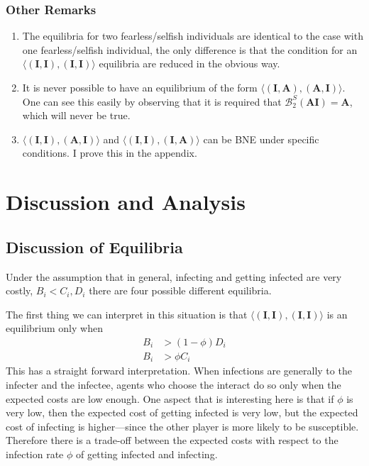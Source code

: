 \documentclass{article}
\theoremstyle{definition}
\theoremstyle{exercise}
\theoremstyle{remark}
\begin{document}
\subsubsection*{Other Remarks}
\begin{enumerate}[1.]
    \item The equilibria for two fearless/selfish individuals are identical to the case with one fearless/selfish individual, the only difference is that the condition for an $\langle (\bm{I}, \bm{I}), (\bm{I}, \bm{I}) \rangle$ equilibria are reduced in the obvious way.
    \item It is never possible to have an equilibrium of the form $ \langle (\bm{I}, \bm{A}), (\bm{A}, \bm{I}) \rangle$. One can see this easily by observing that it is required that $\mathcal{B}^{S}_2(\bm{AI}) = \bm{A}$, which will never be true.
\item $ \langle (\bm{I}, \bm{I}), (\bm{A}, \bm{I}) \rangle$ and $ \langle (\bm{I}, \bm{I}), (\bm{I}, \bm{A}) \rangle$ can be BNE under specific conditions. I prove this in the appendix.
\end{enumerate}


\section{Discussion and Analysis}

\subsection*{Discussion of Equilibria}

Under the assumption that in general, infecting and getting infected are very costly, $B_i < C_i, D_i$ there are four possible different equilibria.

The first thing we can interpret in this situation is that $\langle (\bm{I},\bm{I}), (\bm{I}, \bm{I}) \rangle$ is an equilibrium only when
\begin{align*}
    B_i &> (1 - \phi)D_i \\
    B_i &> \phi C_i
\end{align*}
This has a straight forward interpretation. When infections are generally to the infecter and the infectee, agents who choose the interact do so only when the expected costs are low enough.
One aspect that is interesting here is that if $\phi$ is very low, then the expected cost of getting infected is very low, but the expected cost of infecting is higher---since the other player is more likely to be susceptible. Therefore there is a trade-off between the expected costs with respect to the infection rate $\phi$ of getting infected and infecting.
\end{document}
